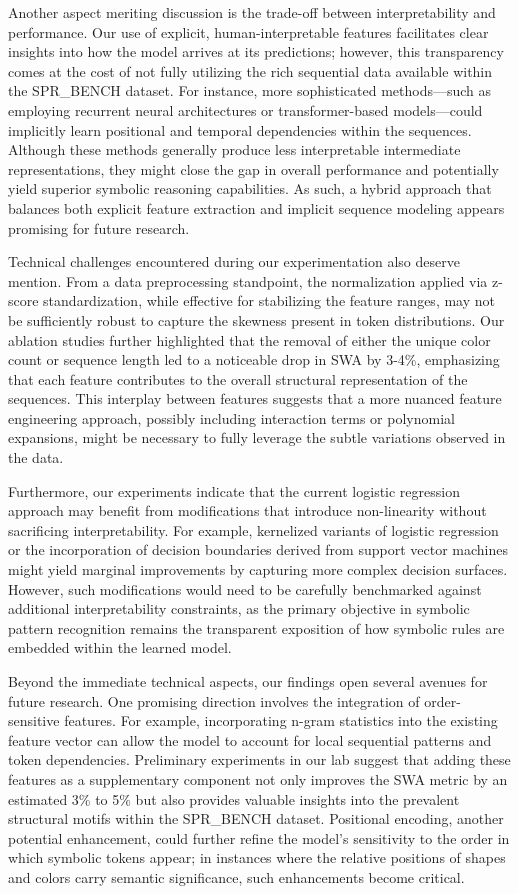 \documentclass{article}
\begin{document}
Another aspect meriting discussion is the trade-off between interpretability and performance. Our use of explicit, human-interpretable features facilitates clear insights into how the model arrives at its predictions; however, this transparency comes at the cost of not fully utilizing the rich sequential data available within the SPR\_BENCH dataset. For instance, more sophisticated methods—such as employing recurrent neural architectures or transformer-based models—could implicitly learn positional and temporal dependencies within the sequences. Although these methods generally produce less interpretable intermediate representations, they might close the gap in overall performance and potentially yield superior symbolic reasoning capabilities. As such, a hybrid approach that balances both explicit feature extraction and implicit sequence modeling appears promising for future research.

Technical challenges encountered during our experimentation also deserve mention. From a data preprocessing standpoint, the normalization applied via z-score standardization, while effective for stabilizing the feature ranges, may not be sufficiently robust to capture the skewness present in token distributions. Our ablation studies further highlighted that the removal of either the unique color count or sequence length led to a noticeable drop in SWA by 3-4\%, emphasizing that each feature contributes to the overall structural representation of the sequences. This interplay between features suggests that a more nuanced feature engineering approach, possibly including interaction terms or polynomial expansions, might be necessary to fully leverage the subtle variations observed in the data.

Furthermore, our experiments indicate that the current logistic regression approach may benefit from modifications that introduce non-linearity without sacrificing interpretability. For example, kernelized variants of logistic regression or the incorporation of decision boundaries derived from support vector machines might yield marginal improvements by capturing more complex decision surfaces. However, such modifications would need to be carefully benchmarked against additional interpretability constraints, as the primary objective in symbolic pattern recognition remains the transparent exposition of how symbolic rules are embedded within the learned model.

Beyond the immediate technical aspects, our findings open several avenues for future research. One promising direction involves the integration of order-sensitive features. For example, incorporating n-gram statistics into the existing feature vector can allow the model to account for local sequential patterns and token dependencies. Preliminary experiments in our lab suggest that adding these features as a supplementary component not only improves the SWA metric by an estimated 3\% to 5\% but also provides valuable insights into the prevalent structural motifs within the SPR\_BENCH dataset. Positional encoding, another potential enhancement, could further refine the model's sensitivity to the order in which symbolic tokens appear; in instances where the relative positions of shapes and colors carry semantic significance, such enhancements become critical.
\end{document}
